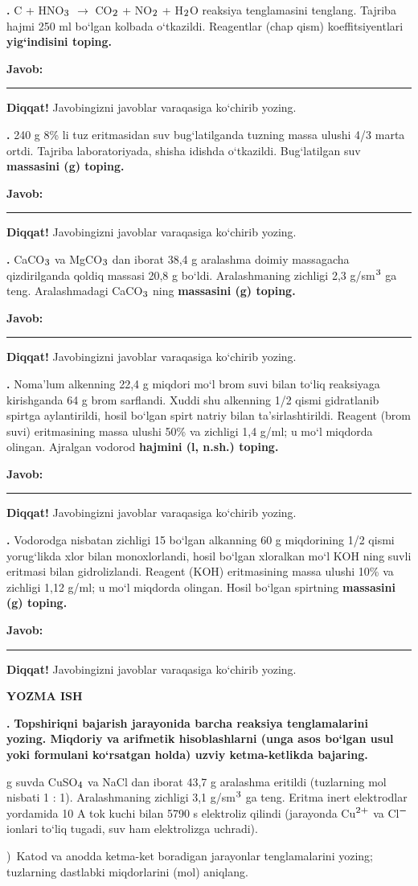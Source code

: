 \documentclass[11pt,a4paper]{article}
\renewcommand{\textsubscript}[1]{\ensuremath{_{\text{\fontsize{8}{8}\selectfont #1}}}}
\renewcommand{\textsuperscript}[1]{\ensuremath{^{\text{\fontsize{8}{8}\selectfont #1}}}}
\newcommand{\qn}[1]{\textbf{\fontsize{11.5}{13}\selectfont #1}}
\newcommand{\qsep}{\par\vspace{13pt}}
\newcommand{\javob}{\par\nopagebreak[4]\smallskip\noindent\textbf{Javob:} \rule[-2pt]{7.5cm}{0.4pt}\par\smallskip\noindent\textbf{Diqqat!} Javobingizni javoblar varaqasiga ko`chirib yozing.\par\medskip}
\begin{document}
\par\bigskip
\noindent\qn{36.} C + HNO\textsubscript{3} $\to$ CO\textsubscript{2} + NO\textsubscript{2} + H\textsubscript{2}O reaksiya tenglamasini tenglang. Tajriba hajmi 250 ml bo`lgan kolbada o`tkazildi. Reagentlar (chap qism) koeffitsiyentlari \textbf{yig`indisini toping.}
\javob\qsep
\noindent\qn{37.} 240 g 8\% li tuz eritmasidan suv bug`latilganda tuzning massa ulushi 4/3 marta ortdi. Tajriba laboratoriyada, shisha idishda o`tkazildi. Bug`latilgan suv \textbf{massasini (g) toping.}
\javob\qsep
\noindent\qn{38.} CaCO\textsubscript{3} va MgCO\textsubscript{3} dan iborat 38,4 g aralashma doimiy massagacha qizdirilganda qoldiq massasi 20,8 g bo`ldi. Aralashmaning zichligi 2,3 g/sm\textsuperscript{3} ga teng. Aralashmadagi CaCO\textsubscript{3} ning \textbf{massasini (g) toping.}
\javob\qsep
\noindent\qn{39.} Noma'lum alkenning 22,4 g miqdori mo`l brom suvi bilan to`liq reaksiyaga kirishganda 64 g brom sarflandi. Xuddi shu alkenning 1/2 qismi gidratlanib spirtga aylantirildi, hosil bo`lgan spirt natriy bilan ta'sirlashtirildi. Reagent (brom suvi) eritmasining massa ulushi 50\% va zichligi 1,4 g/ml; u mo`l miqdorda olingan. Ajralgan vodorod \textbf{hajmini (l, n.sh.) toping.}
\javob\qsep
\noindent\qn{40.} Vodorodga nisbatan zichligi 15 bo`lgan alkanning 60 g miqdorining 1/2 qismi yorug`likda xlor bilan monoxlorlandi, hosil bo`lgan xloralkan mo`l KOH ning suvli eritmasi bilan gidrolizlandi. Reagent (KOH) eritmasining massa ulushi 10\% va zichligi 1,12 g/ml; u mo`l miqdorda olingan. Hosil bo`lgan spirtning \textbf{massasini (g) toping.}
\javob\qsep
\par\bigskip\begin{center}\textbf{\fontsize{13}{15}\selectfont YOZMA ISH}\end{center}
\noindent\qn{41.} \textbf{Topshiriqni bajarish jarayonida barcha reaksiya tenglamalarini yozing. Miqdoriy va arifmetik hisoblashlarni (unga asos bo`lgan usul yoki formulani ko`rsatgan holda) uzviy ketma-ketlikda bajaring.}\par{} g suvda CuSO\textsubscript{4} va NaCl dan iborat 43,7 g aralashma eritildi (tuzlarning mol nisbati 1 : 1). Aralashmaning zichligi 3,1 g/sm\textsuperscript{3} ga teng. Eritma inert elektrodlar yordamida 10 A tok kuchi bilan 5790 s elektroliz qilindi (jarayonda Cu\textsuperscript{2+} va Cl\textsuperscript{$-$} ionlari to`liq tugadi, suv ham elektrolizga uchradi).\par
{})\ Katod va anodda ketma-ket boradigan jarayonlar tenglamalarini yozing; tuzlarning dastlabki miqdorlarini (mol) aniqlang.\par
\end{document}
